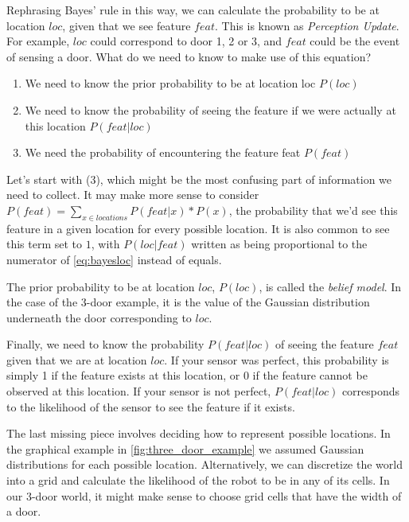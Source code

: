 Rephrasing Bayes' rule in this way, we can calculate the probability to be at location $loc$, given that we see feature $feat$. This is known as \textsl{Perception Update}. For example, $loc$ could correspond to door 1, 2 or 3, and $feat$ could be the event of sensing a door. What do we need to know to make use of this equation?
\begin{enumerate}
\item We need to know the prior probability to be at location loc $P(loc)$
\item We need to know the probability of seeing the feature if we were actually at this location $P(feat|loc)$
\item We need the probability of encountering the feature feat $P(feat)$
\end{enumerate}
Let's start with (3), which might be the most confusing part of information we need to collect. It may make more sense to consider $P(feat)=\sum_{x\in locations}P(feat|x)*P(x)$, the probability that we'd see this feature in a given location for every possible location. It is also common to see this term set to $1$, with $P(loc|feat)$ written as being proportional to the numerator of \cref{eq:bayesloc} instead of equals.

The prior probability to be at location  $loc$, $P(loc)$, is called the  \textsl{belief model}. In the case of the 3-door example, it is the value of the Gaussian distribution underneath the door corresponding to $loc$.

Finally, we need to know the probability $P(feat|loc)$ of seeing the feature $feat$ given that we are at location $loc$. If your sensor was perfect, this probability is simply 1 if the feature exists at this location, or 0 if the feature cannot be observed at this location. If your sensor is not perfect, $P(feat|loc)$ corresponds to the likelihood of the sensor to see the feature if it exists.

The last missing piece involves deciding how to represent possible locations. In the graphical example in \cref{fig:three_door_example} we assumed Gaussian distributions for each possible location. Alternatively, we can discretize the world into a grid and calculate the likelihood of the robot to be in any of its cells. In our 3-door world, it might make sense to choose grid cells that have the width of a door.

